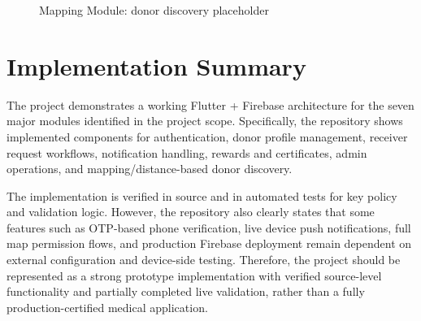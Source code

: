 \begin{figure}[H]
\centering
{}
\caption{Mapping Module: donor discovery placeholder}
\end{figure}


\section{Implementation Summary}

The project demonstrates a working Flutter + Firebase architecture for the seven major modules identified in the project scope. Specifically, the repository shows implemented components for authentication, donor profile management, receiver request workflows, notification handling, rewards and certificates, admin operations, and mapping/distance-based donor discovery.

The implementation is verified in source and in automated tests for key policy and validation logic. However, the repository also clearly states that some features such as OTP-based phone verification, live device push notifications, full map permission flows, and production Firebase deployment remain dependent on external configuration and device-side testing. Therefore, the project should be represented as a strong prototype implementation with verified source-level functionality and partially completed live validation, rather than a fully production-certified medical application.

